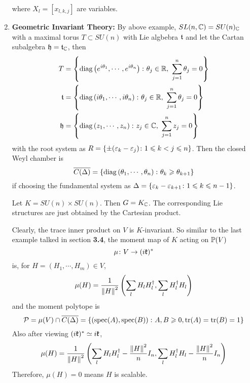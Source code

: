 \documentclass[a4paper,12pt]{article}
\newcommand{\sectionbreak}{\clearpage}
\begin{document}
\begin{enumerate}
\begin{equation*}
		\end{equation*}
		where $X_l = [x_{l,k,j}]$ are variables.
		\item \textbf{Geometric Invariant Theory:} By above example, $SL(n,\mathbb{C}) = SU(n)_{\mathbb{C}}$ with a maximal torus $T \subset SU(n)$ with Lie algbebra $\mathfrak{t}$ and let the Cartan subalgebra $\mathfrak{h} = \mathfrak{t}_{\mathbb{C}}$, then
		\begin{equation*}
			\begin{split}
				T &= \left\{\operatorname{diag}\left(e^{i\theta_1},\cdots,e^{i\theta_n}\right) \colon \theta_j \in \mathbb{R},~\sum_{j=1}^n \theta_j = 0\right\}\\
				\mathfrak{t} &= \left\{\operatorname{diag}\left({i\theta_1},\cdots,{i\theta_n}\right) \colon \theta_j \in \mathbb{R},~\sum_{j=1}^n \theta_j = 0\right\}\\
				\mathfrak{h} &= \left\{\operatorname{diag}\left({ z_1},\cdots,{ z_n}\right) \colon z_j \in \mathbb{C},~\sum_{j=1}^n z_j = 0\right\}
			\end{split}
		\end{equation*}
		with the root system as $R = \left\{\pm (\varepsilon_k-\varepsilon_j) \colon 1 \leqslant k < j \leqslant n\right\}$. Then the closed Weyl chamber is
		\begin{equation*}
		 	\overline{C(\Delta)} = \left\{\operatorname{diag}\left({\theta_1},\cdots,{\theta_n}\right) \colon \theta_k \geqslant \theta_{k+1}\right\}
		\end{equation*}
		if choosing the fundamental system as $\Delta = \left\{\varepsilon_k-\varepsilon_{k+1} \colon 1\leqslant k \leqslant n-1\right\}$.

		Let $K = SU(n) \times SU(n)$. Then $G = K_{\mathbb{C}}$. The corresponding Lie structures are just obtained by the Cartesian product. 

		Clearly, the trace inner product on $V$ is $K$-invariant. So similar to the last example talked in section \textbf{3.4}, the moment map of $K$ acting on $\mathbb{P}(V)$ 
		\begin{equation*}
			\mu \colon V \rightarrow (i\mathfrak{k})^*
		\end{equation*}
		is, for $H = (H_1,\cdots,H_m) \in V$,
		\begin{equation*}
			\mu(H) = \frac{1}{\left\lVert H\right\lVert^2}\left(\sum_{l}H_lH_l^{\dagger},\sum_{l}H_l^{\dagger}H_l\right)
		\end{equation*}
		and the moment polytope is
		\begin{equation*}
			\mathcal{P} = \mu(V) \cap \overline{C(\Delta)} = \left\{\left(\operatorname{spec}(A),\operatorname{spec}(B)\right) \colon A,B \geqslant 0, \operatorname{tr}(A) = \operatorname{tr}(B) = 1\right\}
		\end{equation*}
		Also after viewing $(i\mathfrak{k})^* \simeq i\mathfrak{k}$,
		\begin{equation*}
			\mu(H) = \frac{1}{\left\lVert H\right\lVert^2}\left(\sum_{l}H_lH_l^{\dagger} - \frac{\left\lVert H\right\lVert^2}{n}I_n,\sum_{l}H_l^{\dagger}H_l-\frac{\left\lVert H\right\lVert^2}{n}I_n\right)
		\end{equation*}
		Therefore, $\mu(H) = 0$ means $H$ is scalable.
\end{enumerate}



\nocite{*}




	\sectionbreak
	\printbibliography
\end{document}
